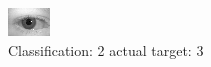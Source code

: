 \begin{figure}[h!]
\begin{center}
\includegraphics[width=0.60\columnwidth]{figures/ID555_class_2_target_3.png}
\end{center}
\caption{ Classification: 2 actual target: 3}
\label{fig:ID555_class_2_target_3}
\end{figure}
